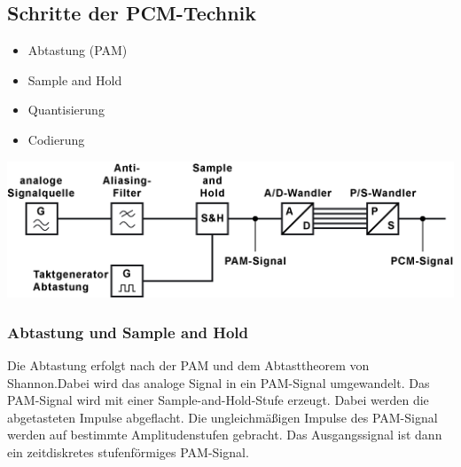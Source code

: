 \documentclass[a4paper,10pt]{article}
\begin{document}
\subsection{Schritte der PCM-Technik}
\begin{itemize}
  \item Abtastung (PAM)
  \item Sample and Hold
  \item Quantisierung
  \item Codierung
\end{itemize}

\includegraphics[scale=0.7]{PCM.png}\\

\subsubsection{Abtastung und Sample and Hold}
Die Abtastung erfolgt nach der PAM und dem Abtasttheorem von Shannon.Dabei wird das analoge Signal in 
ein PAM-Signal umgewandelt. Das PAM-Signal wird mit einer Sample-and-Hold-Stufe erzeugt. Dabei werden
die abgetasteten Impulse abgeflacht. Die ungleichmäßigen Impulse des PAM-Signal werden auf bestimmte Amplitudenstufen 
gebracht. Das Ausgangssignal ist dann ein zeitdiskretes stufenförmiges PAM-Signal.
\end{document}
